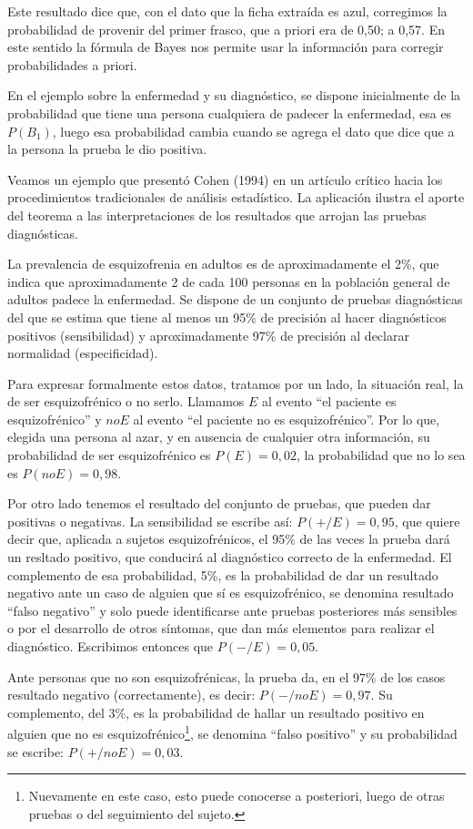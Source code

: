 \documentclass[]{article}
\let\rmarkdownfootnote\footnote%
\def\footnote{\protect\rmarkdownfootnote}
\begin{document}
Este resultado dice que, con el dato que la ficha extraída es azul,
corregimos la probabilidad de provenir del primer frasco, que a priori
era de 0,50; a 0,57. En este sentido la fórmula de Bayes nos permite
usar la información para corregir probabilidades a priori.

En el ejemplo sobre la enfermedad y su diagnóstico, se dispone
inicialmente de la probabilidad que tiene una persona cualquiera de
padecer la enfermedad, esa es \(P(B_{1})\), luego esa probabilidad
cambia cuando se agrega el dato que dice que a la persona la prueba le
dio positiva.

Veamos un ejemplo que presentó Cohen (1994) en un artículo crítico hacia
los procedimientos tradicionales de análisis estadístico. La aplicación
ilustra el aporte del teorema a las interpretaciones de los resultados
que arrojan las pruebas diagnósticas.

La prevalencia de esquizofrenia en adultos es de aproximadamente el 2\%,
que indica que aproximadamente 2 de cada 100 personas en la población
general de adultos padece la enfermedad. Se dispone de un conjunto de
pruebas diagnósticas del que se estima que tiene al menos un 95\% de
precisión al hacer diagnósticos positivos (sensibilidad) y
aproximadamente 97\% de precisión al declarar normalidad
(especificidad).

Para expresar formalmente estos datos, tratamos por un lado, la
situación real, la de ser esquizofrénico o no serlo. Llamamos \(E\) al
evento ``el paciente es esquizofrénico'' y \(noE\) al evento ``el
paciente no es esquizofrénico''. Por lo que, elegida una persona al
azar, y en ausencia de cualquier otra información, su probabilidad de
ser esquizofrénico es \(P(E)=0,02\), la probabilidad que no lo sea es
\(P(noE)=0,98\).

Por otro lado tenemos el resultado del conjunto de pruebas, que pueden
dar positivas o negativas. La sensibilidad se escribe así:
\(P(+/E)=0,95\), que quiere decir que, aplicada a sujetos
esquizofrénicos, el 95\% de las veces la prueba dará un resltado
positivo, que conducirá al diagnóstico correcto de la enfermedad. El
complemento de esa probabilidad, 5\%, es la probabilidad de dar un
resultado negativo ante un caso de alguien que sí es esquizofrénico, se
denomina resultado ``falso negativo'' y solo puede identificarse ante
pruebas posteriores más sensibles o por el desarrollo de otros síntomas,
que dan más elementos para realizar el diagnóstico. Escribimos entonces
que \(P(-/E)=0,05\).

Ante personas que no son esquizofrénicas, la prueba da, en el 97\% de
los casos resultado negativo (correctamente), es decir:
\(P(-/noE)=0,97\). Su complemento, del 3\%, es la probabilidad de hallar
un resultado positivo en alguien que no es esquizofrénico\footnote{Nuevamente
  en este caso, esto puede conocerse a posteriori, luego de otras
  pruebas o del seguimiento del sujeto.}, se denomina ``falso positivo''
y su probabilidad se escribe: \(P(+/noE)=0,03\).
\end{document}
